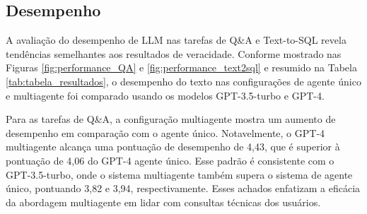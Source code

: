     
        
        \subsection{Desempenho}
            
            A avaliação do desempenho de LLM \cite{Li2023} nas tarefas de Q\&A e Text-to-SQL revela tendências semelhantes aos resultados de veracidade. Conforme mostrado nas Figuras \ref{fig:performance_QA} e \ref{fig:performance_text2sql} e resumido na Tabela \ref{tab:tabela_resultados}, o desempenho do texto nas configurações de agente único e multiagente foi comparado usando os modelos GPT-3.5-turbo e GPT-4. 
            
            Para as tarefas de Q\&A, a configuração multiagente mostra um aumento de desempenho em comparação com o agente único. Notavelmente, o GPT-4 multiagente alcança uma pontuação de desempenho de 4,43, que é superior à pontuação de 4,06 do GPT-4 agente único. Esse padrão é consistente com o GPT-3.5-turbo, onde o sistema multiagente também supera o sistema de agente único, pontuando 3,82 e 3,94, respectivamente. Esses achados enfatizam a eficácia da abordagem multiagente em lidar com consultas técnicas dos usuários.
            

